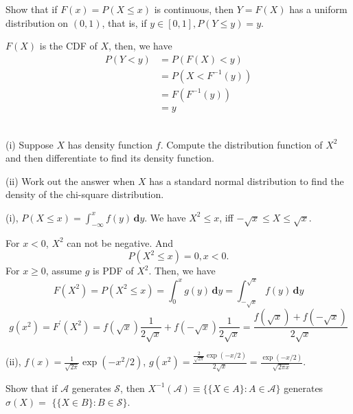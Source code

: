 \documentclass[en, normal, 11pt, black]{elegantnote}
\newenvironment{exercise}[1]{\begin{tcolorbox}[colback=black!15, colframe=black!80, breakable, title=#1]}{\end{tcolorbox}}
\renewenvironment{proof}{\begin{tcolorbox}[colback=white, colframe=black!50, breakable, title=Proof. ]\setlength{\parskip}{0.8em}}{\\\rightline{$\square$}\end{tcolorbox}}
\newenvironment{solution}{\begin{tcolorbox}[colback=white, colframe=black!50, breakable, title=Solution. ]\setlength{\parskip}{0.8em}}{\end{tcolorbox}}
\newcommand{\der}{\,\mathbf{d}}
\begin{document}
    \begin{exercise}{1.2.4}
        Show that if $F(x)=P(X \leq x)$ is continuous, then $Y=F(X)$ has a uniform distribution on $(0,1)$, that is, if $y \in[0,1], P(Y \leq y)=y$.
    \end{exercise}

    \begin{proof}
        $F(X)$ is the CDF of $X$, then, we have
        \begin{align*}
            P(Y<y)&=P(F(X)<y)\\
            &=P(X<F^{-1}(y))\\
            &=F(F^{-1}(y))\\
            &=y
        \end{align*}
        \vspace{-20pt}
    \end{proof}

    \begin{exercise}{1.2.7}
        (i) Suppose $X$ has density function $f$. Compute the distribution function of $X^{2}$ and then differentiate to find its density function. 
        
        (ii) Work out the answer when $X$ has a standard normal distribution to find the density of the chi-square distribution. 
    \end{exercise}

    \begin{solution}
        (i), $P(X\leqslant x)=\int_{-\infty}^xf(y)\der y$. We have $X^2\leqslant x$, iff $-\sqrt{x}\leqslant X \leqslant \sqrt{x}$. 
        
        For $x<0$, $X^2$ can not be negative. And
        \[P(X^2\leqslant x)=0, x<0.\]
        For $x\geqslant 0$, assume $g$ is PDF of $X^2$. Then, we have
        \[F(X^2)=P(X^2\leqslant x)=\int_0^x g(y)\der y=\int_{-\sqrt{x}}^{\sqrt{x}}f(y)\der y\]
        \[g(x^2)=F^\prime(X^2)=f(\sqrt{x})\frac{1}{2\sqrt{x}}+f(-\sqrt{x})\frac{1}{2\sqrt{x}}=\frac{f(\sqrt{x})+f(-\sqrt{x})}{2\sqrt{x}}\]

        (ii), $f(x)=\frac{1}{\sqrt{2\pi}}\exp(-x^2/2)$, $g(x^2)=\frac{\frac{2}{\sqrt{2\pi}}\exp(-x/2)}{2\sqrt{x}}=\frac{\exp(-x/2)}{\sqrt{2\pi x}}$. 
    \end{solution}

    \begin{exercise}{1.3.1}
        Show that if $\mathcal{A}$ generates $\mathcal{S}$, then $X^{-1}(\mathcal{A}) \equiv\{\{X \in A\}: A \in \mathcal{A}\}$ generates $\sigma(X)=$ $\{\{X \in B\}: B \in \mathcal{S}\}$. 
    \end{exercise}
\end{document}
